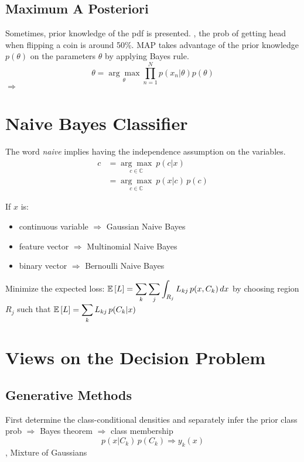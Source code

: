 \subsection{Maximum A Posteriori}
Sometimes, prior knowledge of the \ac{pdf} is presented. \Eg, the \ac{prob} of getting head when flipping a coin is around 50\%. \ac{MAP} takes advantage of the prior knowledge $p(\theta)$ on the parameters $\theta$ by applying Bayes rule.
\begin{equation}
	\theta = \underset{\theta}{\arg\max} \prod^N_{n=1} p(x_n | \theta)p(\theta)
\end{equation}
 $\Rightarrow$ 

\section{Naive Bayes Classifier}
The word \textit{naive} implies having the independence assumption on the variables.
\begin{align}
	c 	&= \underset{c \in \mathbb{C}}{\arg\max}\ p(c|x)\\
		&= \underset{c \in \mathbb{C}}{\arg\max}\ p(x|c)\,p(c)
\end{align}

If $x$ is:
\begin{itemize}
	\item continuous variable $\Rightarrow$ Gaussian Naive Bayes
	\item feature vector $\Rightarrow$ Multinomial Naive Bayes
	\item binary vector $\Rightarrow$ Bernoulli Naive Bayes
\end{itemize}

Minimize the expected loss: $\displaystyle \mathbb{E} \left[ L \right] = \sum_{k}\sum_{j}\int_{R_j}L_{kj}\,p(x, C_k)\,dx$ by choosing region $R_j$ such that $\displaystyle \mathbb{E} \left[ L \right] = \sum_kL_{kj}\,p(C_k| x)$

\section{Views on the Decision Problem}
\subsection{Generative Methods}
First determine the class-conditional densities and separately infer the prior class \ac{prob} $\Rightarrow$ Bayes theorem $\Rightarrow$ class membership
\[p(x|C_k)\,p(C_k) \Rightarrow y_k(x)\]
\Eg, Mixture of Gaussians

